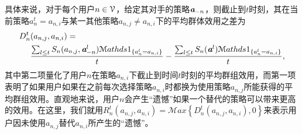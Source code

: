 具体来说，对于每个用户$n\in\mathcal{V}$，给定其对手的策略$\emph{\textbf{a}}_{-n}$，则截止到$t$时刻，其在当前策略$a^t_n=a_{n,i}$与某一其他策略$a_{n,j}\neq a_{n,i}$下的平均群体效用之差为
\begin{align}\label{eq:reg1}
\small
D_n^t&(a_{n,j},a_{n,i})=\nonumber\\
&\frac{\sum_{l\leq t}S_n(a_{n,j},\emph{\textbf{a}}^l_{-n})\mathcal{M}athds{1}_{\{a^l_n=a_{n,i}\}}}{t}-\frac{\sum_{l\leq t}S_n(\emph{\textbf{a}}^l)\mathcal{M}athds{1}_{\{a^l_n=a_{n,i}\}}}{t},
\end{align}
其中第二项量化了用户$n$在策略$a_{n,i}$下截止到时间$t$时刻的平均群组效用，而第一项表明了如果用户如果在之前每次选择策略$a_{n,i}$时都换为使用策略$a_{n,j}$所能获得的平均群组效用。直观地来说，用户$n$会产生“遗憾”如果一个替代的策略可以带来更高的效用。在这里，我们就用$R^t_n(a_{n,j},a_{n,i})=\mathcal{M}ax\left\{D^t_n(a_{n,j},a_{n,i}),0\right\}$来表示用户因未使用$a_{n,j}$替代$a_{n,i}$所产生的“遗憾”。

